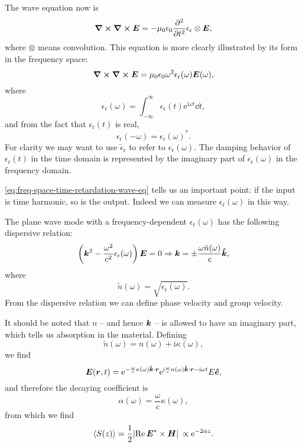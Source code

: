 \documentclass[hyperref, a4paper]{article}
\newcommand*{\ii}{\mathrm{i}}
\newcommand*{\ee}{\mathrm{e}}
\newcommand{\epsr}{\epsilon_{\text{r}}}
\begin{document}
The wave equation now is 
\begin{equation}
    \curl{\curl{\vb*{E}}} = - \mu_0 \epsilon_0 \pdv[2]{t}
    \epsr \otimes \vb*{E},
\end{equation}
where $\otimes$ means convolution.
This equation is more clearly illustrated by its form in the frequency space: 
\begin{equation}
    \curl{\curl{\vb*{E}}} = \mu_0 \epsilon_0 \omega^2 \epsr(\omega) \vb*{E}(\omega),
    \label{eq:freq-space-time-retardation-wave-eq}
\end{equation}
where 
\begin{equation}
    \epsr(\omega) = \int_{-\infty}^\infty \epsr(t) \ee^{\ii \omega t} \dd{t},
\end{equation}
and from the fact that $\epsr(t)$ is real, 
\begin{equation}
    \epsr(-\omega) = \epsr(\omega)^*.
\end{equation}
For clarity we may want to use $\tilde{\epsilon}_{\text{r}}$ 
to refer to $\epsr(\omega)$.
The damping behavior of $\epsr(t)$ in the time domain 
is represented by the imaginary part of $\epsr(\omega)$ in the frequency domain.

\eqref{eq:freq-space-time-retardation-wave-eq} tells us an important point:
if the input is time harmonic, 
so is the output.
Indeed we can measure $\epsr(\omega)$ in this way.

The plane wave mode with a frequency-dependent $\epsr(\omega)$ 
has the following dispersive relation:
\begin{equation}
    \left(
        \vb*{k}^2 - \frac{\omega^2}{c^2} \epsr(\omega)
    \right) \vb*{E} = 0 \Rightarrow
    \vb*{k} = \pm \frac{\omega \tilde{n}(\omega)}{c} \vu*{k}, 
\end{equation}
where 
\begin{equation}
    \tilde{n}(\omega) = \sqrt{\epsr(\omega)}.
\end{equation}
From the dispersive relation 
we can define phase velocity and group velocity.

It should be noted that $n$ -- and hence $\vb*{k}$ -- 
is allowed to have an imaginary part,
which tells us absorption in the material. 
Defining 
\begin{equation}
    \tilde{n}(\omega) = n(\omega) + \ii \kappa(\omega),
\end{equation}
we find 
\begin{equation}
    \vb*{E}(\vb*{r}, t) = \ee^{
        - \frac{\omega}{c} \kappa(\omega) \vu*{k} \cdot \vb*{r}
    }
    \ee^{
        \ii \frac{\omega}{c} n(\omega) \vu*{k} \cdot \vb*{r}
        - \ii \omega t
    } E \vu*{e},
\end{equation}
and therefore the decaying coefficient is  
\begin{equation}
    \alpha(\omega) = \frac{\omega}{c} \kappa(\omega),  
\end{equation}
from which we find 
\begin{equation}
    \expval{S(z)} = \frac{1}{2} \abs*{
        \Re \vb*{E}^* \times \vb*{H}
    } \propto \ee^{- 2 \alpha z}.
\end{equation}
\end{document}
